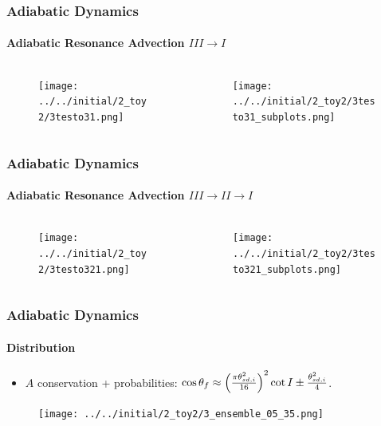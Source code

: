 \documentclass[dvipsnames]{beamer}
\DeclarePairedDelimiter\p{\lparen}{\rparen}
\begin{document}
\begin{frame}
    \frametitle{Adiabatic Dynamics}
    \framesubtitle{Adiabatic Resonance Advection $III \to I$}

    \begin{columns}
        \begin{column}{0.5\textwidth}
            \begin{figure}[t]
                \centering
                \texttt{[image: ../../initial/2\_toy2/3testo31.png]}
            \end{figure}
        \end{column}
        \begin{column}{0.5\textwidth}
            \begin{figure}[t]
                \centering
                \texttt{[image: ../../initial/2\_toy2/3testo31\_subplots.png]}
            \end{figure}
        \end{column}
    \end{columns}
\end{frame}

\begin{frame}
    \frametitle{Adiabatic Dynamics}
    \framesubtitle{Adiabatic Resonance Advection $III \to II \to I$}

    \begin{columns}
        \begin{column}{0.5\textwidth}
            \begin{figure}[t]
                \centering
                \texttt{[image: ../../initial/2\_toy2/3testo321.png]}
            \end{figure}
        \end{column}
        \begin{column}{0.5\textwidth}
            \begin{figure}[t]
                \centering
                \texttt{[image: ../../initial/2\_toy2/3testo321\_subplots.png]}
            \end{figure}
        \end{column}
    \end{columns}
\end{frame}

\begin{frame}
    \frametitle{Adiabatic Dynamics}
    \framesubtitle{Distribution}
    \begin{itemize}
        \item $A$ conservation + probabilities: $\cos \theta_f \approx
            \p*{\frac{\pi \theta_{sd,i}^2}{16}}^2 \cot I \pm
            \frac{\theta_{sd,i}^2}{4}$.
    \end{itemize}
    \begin{figure}[t]
        \centering
        \texttt{[image: ../../initial/2\_toy2/3\_ensemble\_05\_35.png]}
    \end{figure}
\end{frame}
\end{document}
